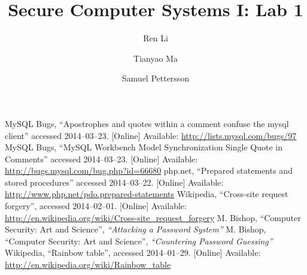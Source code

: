 \documentclass{article}
\title{\textbf{Secure Computer Systems I: Lab 1}}
\author{Ren Li \and Tianyao Ma \and Samuel Pettersson}
\begin{document}
\maketitle



\begin{thebibliography}{9}
  MySQL Bugs,
  ``Apostrophes and quotes within a comment confuse the mysql client''
  accessed 2014--03--23.
  [Online]
  Available: \url{http://lists.mysql.com/bugs/97}
  MySQL Bugs,
  ``MySQL Workbench Model Synchronization Single Quote in Comments''
  accessed 2014--03--23.
  [Online]
  Available: \url{http://bugs.mysql.com/bug.php?id=66680}
  php.net,
  ``Prepared statements and stored procedures''
  accessed 2014--03--22.
  [Online]
  Available: \url{http://www.php.net/pdo.prepared-statements}
  Wikipedia,
  ``Cross-site request forgery'',
  accessed 2014--02--01.
  [Online]
  Available: \url{http://en.wikipedia.org/wiki/Cross-site_request_forgery}
  M. Bishop,
  ``Computer Security: Art and Science'',
  \textit{``Attacking a Password System''}
  M. Bishop,
  ``Computer Security: Art and Science'',
  \textit{``Countering Password Guessing''}
  Wikipedia,
  ``Rainbow table'',
  accessed 2014--01--29.
  [Online]
  Available: \url{http://en.wikipedia.org/wiki/Rainbow_table}
\end{thebibliography}
\end{document}
